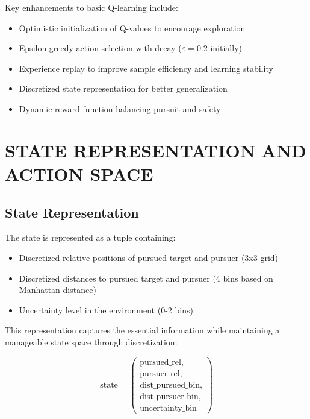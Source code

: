 \documentclass[letterpaper, 10 pt, conference]{ieeeconf}
\begin{document}
Key enhancements to basic Q-learning include:
\begin{itemize}
    \item Optimistic initialization of Q-values to encourage exploration
    \item Epsilon-greedy action selection with decay ($\varepsilon = 0.2$ initially)
    \item Experience replay to improve sample efficiency and learning stability
    \item Discretized state representation for better generalization
    \item Dynamic reward function balancing pursuit and safety
\end{itemize}

\section{STATE REPRESENTATION AND ACTION SPACE}
\subsection{State Representation}
The state is represented as a tuple containing:
\begin{itemize}
    \item Discretized relative positions of pursued target and pursuer (3x3 grid)
    \item Discretized distances to pursued target and pursuer (4 bins based on Manhattan distance)
    \item Uncertainty level in the environment (0-2 bins)
\end{itemize}

This representation captures the essential information while maintaining a manageable state space through discretization:

\[
\text{state} = \left(
\begin{array}{l}
\text{pursued\_rel}, \\
\text{pursuer\_rel}, \\
\text{dist\_pursued\_bin}, \\
\text{dist\_pursuer\_bin}, \\
\text{uncertainty\_bin}
\end{array}
\right)
\]
\end{document}

